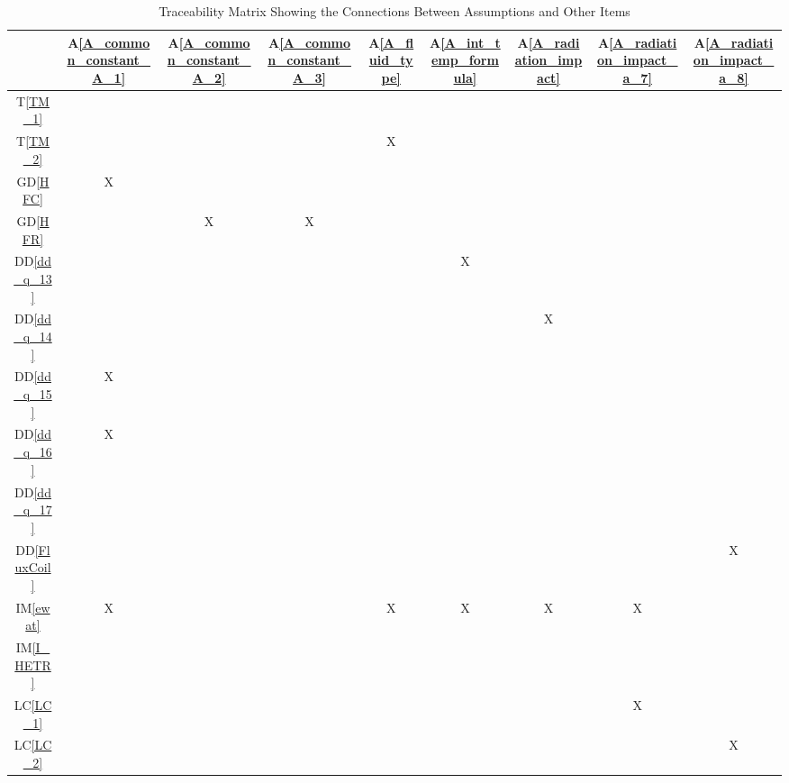\documentclass[12pt]{article}
\newcommand{\dref}[1]{GD\ref{#1}}
\newcommand{\ddref}[1]{DD\ref{#1}}
\newcommand{\tref}[1]{T\ref{#1}}
\newcommand{\aref}[1]{A\ref{#1}}
\newcommand{\iref}[1]{IM\ref{#1}}
\newcommand{\lcref}[1]{LC\ref{#1}}
\begin{document}
\begin{table}[h!]
\centering
\begin{tabular}{|c|c|c|c|c|c|c|c|c|}
\hline
	& \aref{A_common_constant_A_1}& \aref{A_common_constant_A_2}& \aref{A_common_constant_A_3}& \aref{A_fluid_type}& \aref{A_int_temp_formula}& \aref{A_radiation_impact}& \aref{A_radiation_impact_a_7}& \aref{A_radiation_impact_a_8} \\

 

\hline
\tref{TM_1}     & & & & & & & &  \\ \hline
\tref{TM_2}     & & & & X& & & & \\ \hline
\dref{HFC}        & X& & & & & & &  \\ \hline
\dref{HFR}      & & X& X& & & & &  \\ \hline
\ddref{dd_q_13} & & & & & X& & &  \\ \hline
\ddref{dd_q_14}  & & & & & &X & &  \\ \hline
\ddref{dd_q_15}    & X& & & & & & &  \\ \hline
\ddref{dd_q_16}     & X& & & & & & & \\ \hline
\ddref{dd_q_17}     & & & & & & & &  \\ \hline
\ddref{FluxCoil}     & & & & & & & &X  \\ \hline
\iref{ewat}      & X& & &X &X &X &X &  \\ \hline
\iref{I_HETR}      & & & & & & & &  \\ \hline
\lcref{LC_1}      & & & & & & & X&  \\ \hline
\lcref{LC_2}      & & & & & & & & X \\ 

\hline
\end{tabular}
\caption{Traceability Matrix Showing the Connections Between Assumptions and Other Items}
\label{Table:A_trace}
~\newline
\end{table}
\end{document}
